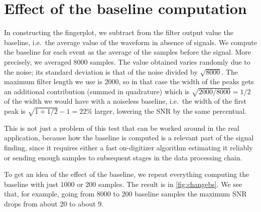 \section{Effect of the baseline computation}

In constructing the fingerplot, we subtract from the filter output value the
baseline, i.e.\ the average value of the waveform in absence of signals. We
compute the baseline for each event as the average of the samples before the
signal. More precisely, we averaged \num{8000} samples. The value obtained
varies randomly due to the noise; its standard deviation is that of the noise
divided by $\sqrt{8000}$. The maximum filter length we use is 2000, so in that
case the width of the peaks gets an additional contribution (summed in
quadrature) which is $\sqrt{2000/8000} = 1/2$ of the width we would have with a
noiseless baseline, i.e.\ the width of the first peak is $\sqrt{1 + 1/2} - 1 =
\SI{22}\%$ larger, lowering the SNR by the same percentual.

This is not just a problem of this test that can be worked around in the real
application, because how the baseline is computed is a relevant part of the
signal finding, since it requires either a fast on-digitizer algorithm
estimating it reliably or sending enough samples to subsequent stages in the
data processing chain.

To get an idea of the effect of the baseline, we repeat everything computing
the baseline with just 1000 or 200 samples. The result is in
\autoref{fig:changebs}. We see that, for example, going from 8000 to 200
baseline samples the maximum SNR drops from about 20 to about 9.


\begin{figure}
    

\end{figure}

